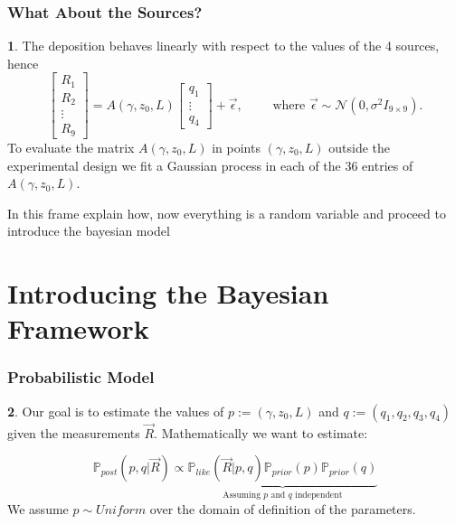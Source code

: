 \documentclass[11pt]{beamer}
\theoremstyle{plain}
\theoremstyle{definition}
\newtheorem{dfn}{}[section]
\newcommand{\p}{\mathbb{P}}
\newcommand{\like}{\p_{like}}
\newcommand{\prior}{\p_{prior}}
\newcommand{\post}{\p_{post}}
\begin{document}
\begin{frame}
\frametitle{What About the Sources?}

\begin{dfn}
The deposition behaves linearly  with respect to the values of the 4  sources,
hence
\begin{equation*}
\begin{bmatrix}
R_{1} \\
R_{2} \\
\vdots\\
R_{9}
\end{bmatrix}=A(\gamma,z_{0},L)
\begin{bmatrix}
q_{1}\\
\vdots\\
q_{4}
\end{bmatrix}
+\vec{\epsilon},\qquad\text{ where } \vec{\epsilon}\sim\mathcal{N}(0,
\sigma^{2}I_{9\times 9}).
\end{equation*}
To evaluate the matrix $A(\gamma,z_{0},L)$ in points $(\gamma,z_{0},L)$ outside the experimental design we fit a 
Gaussian process in each of the 36 entries of $A(\gamma,z_{0},L)$.
\end{dfn}
\end{frame}

\begin{frame}
In this frame explain how, now everything is a
random variable and proceed to introduce the
bayesian model
\end{frame}


\section{Introducing the Bayesian Framework}


\begin{frame}
\frametitle{Probabilistic Model}

\begin{dfn}
Our goal is to estimate the values of $p:=(\gamma,z_{0},L)$ and 
$q:=(q_{1},q_{2},q_{3},q_{4})$ given the measurements
$\vec{R}$. Mathematically we want to estimate:

\begin{equation*}
\post(p,q|\vec{R})\propto
\underbrace{\like(\vec{R}|p,q)\prior(p)\prior(q)}_{\text{Assuming $p$ and $q$ independent}}
\end{equation*}
We assume $p\sim Uniform$ over the domain of definition of the parameters.
 
\end{dfn}
\end{frame}
\end{document}
